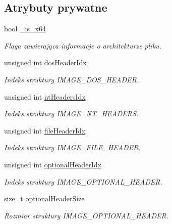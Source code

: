 \subsection*{Atrybuty prywatne}
\begin{DoxyCompactItemize}
\item 
bool \hyperlink{class_p_e_file_a28a6e9fe7d586a07fc2094076293216e}{\-\_\-is\-\_\-x64}
\begin{DoxyCompactList}\small\item\em Flaga zawierająca informacje o architekturze pliku. \end{DoxyCompactList}\item 
unsigned int \hyperlink{class_p_e_file_aa813f4eef94aa75a0b537515b7253293}{dos\-Header\-Idx}
\begin{DoxyCompactList}\small\item\em Indeks struktury I\-M\-A\-G\-E\-\_\-\-D\-O\-S\-\_\-\-H\-E\-A\-D\-E\-R. \end{DoxyCompactList}\item 
unsigned int \hyperlink{class_p_e_file_affd75caf053c5f827b335ea7ac0b1cfa}{nt\-Headers\-Idx}
\begin{DoxyCompactList}\small\item\em Indeks struktury I\-M\-A\-G\-E\-\_\-\-N\-T\-\_\-\-H\-E\-A\-D\-E\-R\-S. \end{DoxyCompactList}\item 
unsigned int \hyperlink{class_p_e_file_a1e3de62b90006b727516b9216c19af56}{file\-Header\-Idx}
\begin{DoxyCompactList}\small\item\em Indeks struktury I\-M\-A\-G\-E\-\_\-\-F\-I\-L\-E\-\_\-\-H\-E\-A\-D\-E\-R. \end{DoxyCompactList}\item 
unsigned int \hyperlink{class_p_e_file_a56b4375d7c13859e289bfa6e6f58fffc}{optional\-Header\-Idx}
\begin{DoxyCompactList}\small\item\em Indeks struktury I\-M\-A\-G\-E\-\_\-\-O\-P\-T\-I\-O\-N\-A\-L\-\_\-\-H\-E\-A\-D\-E\-R. \end{DoxyCompactList}\item 
size\-\_\-t \hyperlink{class_p_e_file_a4f2168508a33d89fa8a28b7912be97e3}{optional\-Header\-Size}
\begin{DoxyCompactList}\small\item\em Rozmiar struktury I\-M\-A\-G\-E\-\_\-\-O\-P\-T\-I\-O\-N\-A\-L\-\_\-\-H\-E\-A\-D\-E\-R. \end{DoxyCompactList}\item 

\end{DoxyCompactItemize}
